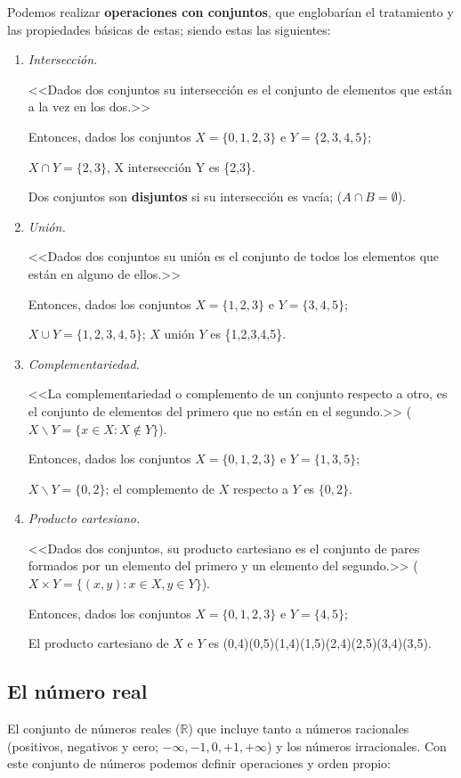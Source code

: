 \documentclass[11pt, oneside, titlepage]{article}
\begin{document}
Podemos realizar \textbf{operaciones con conjuntos}, que englobarían el tratamiento y las propiedades básicas de estas; siendo estas las siguientes:
\begin{enumerate}
\item \emph{Intersección.}

<<Dados dos conjuntos su intersección es el conjunto de elementos que están a la vez en los dos.>>

Entonces, dados los conjuntos $X=\{0,1,2,3\}$ e $Y=\{2,3,4,5\}$; 

$X \cap Y = \{2,3\}$, X intersección Y es \{2,3\}.

Dos conjuntos son \textbf{disjuntos} si su intersección es vacía; ($A \cap B = \emptyset$).
\item \emph{Unión.}

<<Dados dos conjuntos su unión es el conjunto de todos los elementos que están en alguno de ellos.>>

Entonces, dados los conjuntos $X=\{1,2,3\}$ e $Y=\{3,4,5\}$; 

$X \cup Y = \{1,2,3,4,5\}$; $X$ unión $Y$ es \{1,2,3,4,5\}.
\item \emph{Complementariedad.}

<<La complementariedad o complemento de un conjunto respecto a otro, es el conjunto de elementos del primero que no están en el segundo.>> ($X \backslash Y = \{x \in X : X \notin Y\}$).

Entonces, dados los conjuntos $X=\{0,1,2,3\}$ e $Y=\{1,3,5\}$;

$X \backslash Y = \{0,2\}$; el complemento de $X$ respecto a $Y$ es $\{0,2\}$.
\item \emph{Producto cartesiano.}

<<Dados dos conjuntos, su producto cartesiano es el conjunto de pares formados por un elemento del primero y un elemento del segundo.>> ($X \times Y = \{(x,y) : x \in X, y \in Y\}$).

Entonces, dados los conjuntos $X=\{0,1,2,3\}$ e $Y=\{4,5\}$;

El producto cartesiano de $X$ e $Y$ es (0,4)(0,5)(1,4)(1,5)(2,4)(2,5)(3,4)(3,5).
\end{enumerate}
 
\subsection{El número real}
El conjunto de números reales ($\mathds{R}$) que incluye tanto a números racionales (positivos, negativos y cero; $-\infty,-1,0,+1,+\infty$) y los números irracionales. Con este conjunto de números podemos definir operaciones y orden propio:
\end{document}
